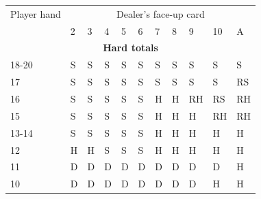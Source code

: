 \documentclass[conference]{IEEEtran}
\begin{document}
\begin{table}[ht]
\begin{tabular}{|l|l|l|l|l|l|l|l|l|l|l|}
{Player hand} & \multicolumn{10}{c|}{Dealer's face-up card}     \\ \cline{2-11} 
                             & 2 & 3 & 4 & 5 & 6 & 7 & 8 & 9 & 10 & A \\ \hline
\multicolumn{11}{|c|}{\textbf{Hard totals}}                           \\ \hline
18-20       								 & \cellcolor{red!75}S & \cellcolor{red!75}S & \cellcolor{red!75}S & \cellcolor{red!75}S & \cellcolor{red!75}S & \cellcolor{red!75}S & \cellcolor{red!75}S & \cellcolor{red!75}S & \cellcolor{red!75}S & \cellcolor{red!75}S  \\ \hline
17                           & \cellcolor{red!75}S & \cellcolor{red!75}S & \cellcolor{red!75}S & \cellcolor{red!75}S & \cellcolor{red!75}S & \cellcolor{red!75}S & \cellcolor{red!75}S & \cellcolor{red!75}S & \cellcolor{red!75}S & \cellcolor{magenta!80}RS  \\ \hline
16                           & \cellcolor{red!75}S & \cellcolor{red!75}S & \cellcolor{red!75}S & \cellcolor{red!75}S & \cellcolor{red!75}S & \cellcolor{green!50}H & \cellcolor{green!50}H & \cellcolor{magenta!80}RH & \cellcolor{magenta!80}RS & \cellcolor{magenta!80}RH  \\ \hline
15                           & \cellcolor{red!75}S & \cellcolor{red!75}S & \cellcolor{red!75}S & \cellcolor{red!75}S & \cellcolor{red!75}S & \cellcolor{green!50}H & \cellcolor{green!50}H & \cellcolor{green!50}H & \cellcolor{magenta!80}RH & \cellcolor{magenta!80}RH \\ \hline
13-14                        & \cellcolor{red!75}S & \cellcolor{red!75}S & \cellcolor{red!75}S & \cellcolor{red!75}S & \cellcolor{red!75}S & \cellcolor{green!50}H & \cellcolor{green!50}H & \cellcolor{green!50}H & \cellcolor{green!50}H & \cellcolor{green!50}H  \\ \hline
12                           & \cellcolor{green!50}H & \cellcolor{green!50}H & \cellcolor{red!75}S & \cellcolor{red!75}S & \cellcolor{red!75}S & \cellcolor{green!50}H & \cellcolor{green!50}H & \cellcolor{green!50}H & \cellcolor{green!50}H & \cellcolor{green!50}H  \\ \hline
11                           & \cellcolor{blue!25}D & \cellcolor{blue!25}D & \cellcolor{blue!25}D & \cellcolor{blue!25}D & \cellcolor{blue!25}D & \cellcolor{blue!25}D & \cellcolor{blue!25}D & \cellcolor{blue!25}D & \cellcolor{blue!25}D & \cellcolor{green!50}H  \\ \hline
10                           & \cellcolor{blue!25}D & \cellcolor{blue!25}D & \cellcolor{blue!25}D & \cellcolor{blue!25}D & \cellcolor{blue!25}D & \cellcolor{blue!25}D & \cellcolor{blue!25}D & \cellcolor{blue!25}D & \cellcolor{green!50}H & \cellcolor{green!50}H \\ \hline

\end{tabular}
\end{table}
\end{document}
